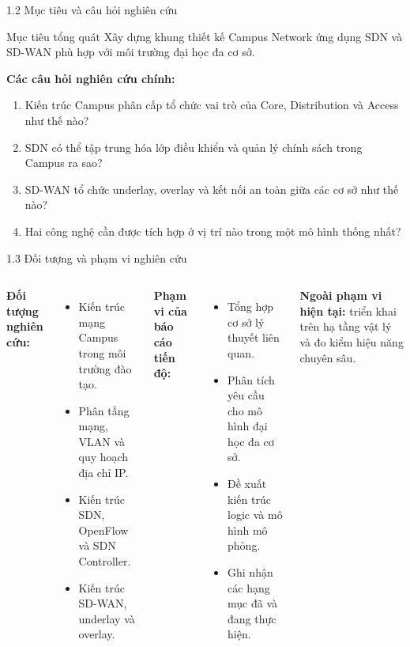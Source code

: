 \begin{frame}{1.2 Mục tiêu và câu hỏi nghiên cứu}
    \begin{block}{Mục tiêu tổng quát}
        Xây dựng khung thiết kế Campus Network ứng dụng SDN và SD-WAN phù hợp với môi trường đại học đa cơ sở.
    \end{block}
    \vspace{0.15cm}
    \textbf{Các câu hỏi nghiên cứu chính:}
    \begin{enumerate}
        \item Kiến trúc Campus phân cấp tổ chức vai trò của Core, Distribution và Access như thế nào?
        \item SDN có thể tập trung hóa lớp điều khiển và quản lý chính sách trong Campus ra sao?
        \item SD-WAN tổ chức underlay, overlay và kết nối an toàn giữa các cơ sở như thế nào?
        \item Hai công nghệ cần được tích hợp ở vị trí nào trong một mô hình thống nhất?
    \end{enumerate}
\end{frame}

\begin{frame}{1.3 Đối tượng và phạm vi nghiên cứu}
    \begin{columns}[T]
        \textbf{Đối tượng nghiên cứu:}
        \begin{itemize}
            \item Kiến trúc mạng Campus trong môi trường đào tạo.
            \item Phân tầng mạng, VLAN và quy hoạch địa chỉ IP.
            \item Kiến trúc SDN, OpenFlow và SDN Controller.
            \item Kiến trúc SD-WAN, underlay và overlay.
        \end{itemize}

        \textbf{Phạm vi của báo cáo tiến độ:}
        \begin{itemize}
            \item Tổng hợp cơ sở lý thuyết liên quan.
            \item Phân tích yêu cầu cho mô hình đại học đa cơ sở.
            \item Đề xuất kiến trúc logic và mô hình mô phỏng.
            \item Ghi nhận các hạng mục đã và đang thực hiện.
        \end{itemize}
        \vspace{0.1cm}
        \textbf{Ngoài phạm vi hiện tại:} triển khai trên hạ tầng vật lý và đo kiểm hiệu năng chuyên sâu.
    \end{columns}
\end{frame}

